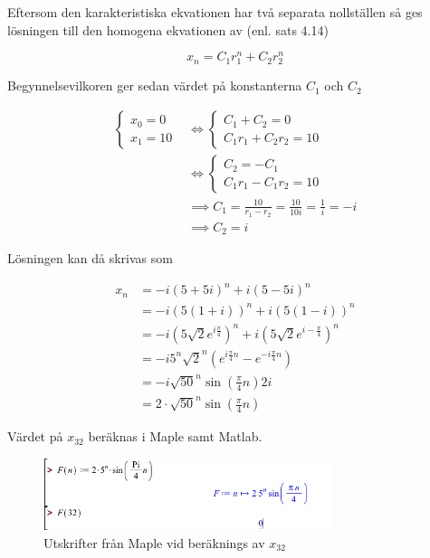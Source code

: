\documentclass[a4paper]{article}
\begin{document}
Eftersom den karakteristiska ekvationen har två separata nollställen så ges lösningen till den homogena ekvationen av (enl. sats 4.14)

\begin{equation*}
	x_n = C_1r_1^n + C_2r_2^n
\end{equation*}
	
Begynnelsevilkoren ger sedan värdet på konstanterna $C_1$ och $C_2$

\begin{align*}
	\begin{cases}
		x_0 = 0\\
		x_1 = 10
	\end{cases}
	&\iff
	\begin{cases}
		C_1 + C_2 = 0\\
		C_1r_1 + C_2r_2 = 10
	\end{cases}\\
	&\iff
	\begin{cases}
		C_2 = -C_1\\
		C_1r_1 - C_1r_2 = 10
	\end{cases}\\
	&\implies C_1 = \frac{10}{r_1 - r_2} = \frac{10}{10i} = \frac{1}{i} = -i\\
	&\implies C_2 = i
\end{align*}

Lösningen kan då skrivas som

\begin{align*}
	x_n		&= -i(5+5i)^n + i(5-5i)^n\\
			&= -i(5(1+i))^n + i(5(1-i))^n\\
			&= -i(5\sqrt{2}e^{i\frac{\pi}{4}})^n + i(5\sqrt{2}e^{i-\frac{\pi}{4}})^n\\
			&= -i5^n\sqrt{2}^n(e^{i\frac{\pi}{4}n} - e^{-i\frac{\pi}{4}n})\\
			&= -i\sqrt{50}^n\sin\left(\frac{\pi}{4}n\right)2i\\
			&= 2\cdot\sqrt{50}^n\sin\left(\frac{\pi}{4}n\right)
\end{align*}

Värdet på $x_{32}$ beräknas i Maple samt Matlab.

\begin{figure}[h!]
	\centering
	\includegraphics[width=0.75\textwidth]{maple.png}
	\caption{Utskrifter från Maple vid beräknings av $x_{32}$}
	\label{fig:maple}
\end{figure}
\end{document}
